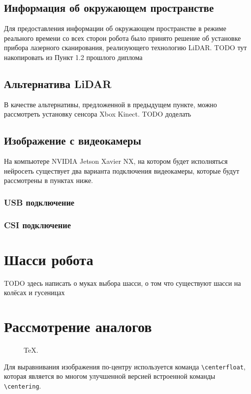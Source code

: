 \subsection{Информация об окружающем пространстве}
Для предоставления информации об окружающем пространстве в режиме реального времени со всех сторон робота было принято решение об установке прибора лазерного сканирования, реализующего технологию LiDAR.
TODO тут накопировать из Пункт 1.2 прошлого диплома

\subsection{Альтернатива LiDAR}
В качестве альтернативы, предложенной в предыдущем пункте, можно рассмотреть установку сенсора Xbox Kinect. TODO доделать

\subsection{Изображение с видеокамеры}
На компьютере NVIDIA Jetson Xavier NX, на котором будет исполняться нейросеть существует два варианта подключения видеокамеры, которые будут рассмотрены в пунктах ниже.

\subsubsection{USB подключение}

\subsubsection{CSI подключение}

\section{Шасси робота}
TODO здесь написать о муках выбора шасси, о том что существуют шасси на колёсах и гусеницах

\section{Рассмотрение аналогов}

\begin{figure}[ht]
    \caption{TeX.}\label{fig:latex}
\end{figure}

Для выравнивания изображения по-центру используется команда \verb+\centerfloat+, которая является во
многом улучшенной версией встроенной команды \verb+\centering+.

